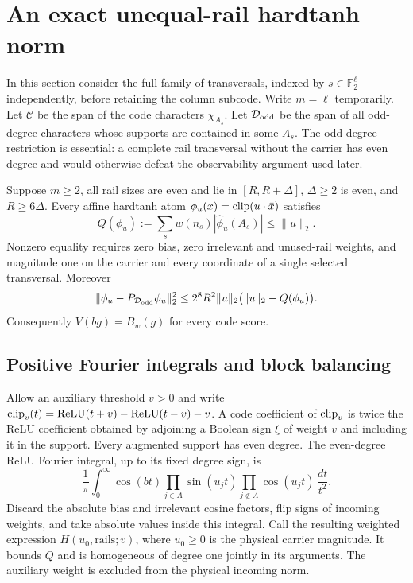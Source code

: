 \section{An exact unequal-rail hardtanh norm}
\label{sec:atomic}

In this section consider the full family of transversals, indexed by
$s\in\mathbb F_2^{\ell}$ independently, before retaining the column
subcode. Write $m=\ell$ temporarily. Let $\mathcal C$ be the span of the code characters $\chi_{A_s}$.
Let $\mathcal D_{\rm odd}$ be the span of all odd-degree characters
whose supports are contained in some $A_s$.
The odd-degree restriction is essential: a complete rail transversal
without the carrier has even degree and would otherwise defeat the
observability argument used later.

\begin{theorem}
\label{thm:atomic}
Suppose $m\ge2$, all rail sizes are even and lie in $[R,R+\Delta]$,
$\Delta\ge2$ is even, and $R\ge6\Delta$.
Every affine hardtanh atom $\phi_u(x)=\operatorname{clip}(u\cdot\bar x)$ satisfies
\[
 Q(\phi_u):=\sum_s w(n_s)|\widehat\phi_u(A_s)|\le\|u\|_2.
\]
Nonzero equality requires zero bias, zero irrelevant and unused-rail
weights, and magnitude one on the carrier and every coordinate of a
single selected transversal. Moreover
\begin{equation}\label{eq:atomic-stability}
 \|\phi_u-P_{\mathcal D_{\rm odd}}\phi_u\|_2^2
 \le2^8R^2\|u\|_2\bigl(\|u\|_2-Q(\phi_u)\bigr).
\end{equation}
Consequently $V(bg)=B_w(g)$ for every code score.
\end{theorem}

\subsection{Positive Fourier integrals and block balancing}

Allow an auxiliary threshold $v>0$ and write
$\operatorname{clip}_v(t)=\operatorname{ReLU}(t+v)-\operatorname{ReLU}(t-v)-v$.
A code coefficient of $\operatorname{clip}_v$ is twice the ReLU coefficient obtained
by adjoining a Boolean sign $\xi$ of weight $v$ and including it in
the support. Every augmented support has even degree. The even-degree
ReLU Fourier integral, up to its fixed degree sign, is
\begin{equation}\label{eq:relu-integral}
 \frac1\pi\int_0^\infty\cos(bt)
   \prod_{j\in A}\sin(u_jt)
   \prod_{j\notin A}\cos(u_jt)\,\frac{dt}{t^2}.
\end{equation}
Discard the absolute bias and irrelevant cosine factors, flip signs
of incoming weights, and take absolute values inside this integral.
Call the resulting weighted expression $H(u_0,\mathrm{rails};v)$,
where $u_0\ge0$ is the physical carrier magnitude. It bounds $Q$
and is homogeneous of degree one jointly in its arguments. The
auxiliary weight is excluded from the physical incoming norm.

